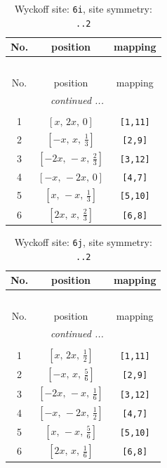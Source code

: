 \documentclass[fleqn,8pt]{jsarticle}
\begin{document}
\renewcommand{\arraystretch}{1.2}
\begin{longtable}{ccc}
\caption{Wyckoff site: {\tt 6i}, site symmetry: {\tt ..2}}
 \\
 \hline \hline
No. & position & mapping \\ \hline \endfirsthead

\multicolumn{2}{l}{\tablename\ \thetable{}} \\
 \hline \hline
No. & position & mapping \\ \hline \endhead

 \hline \hline
\multicolumn{2}{r}{\footnotesize\it continued ...} \\ \endfoot

 \hline \hline
\multicolumn{2}{r}{} \\ \endlastfoot

1 & $\left[ x,\, 2 x,\, 0 \right]$ & {\tt [1,11]} \\ \hline
2 & $\left[ - x,\, x,\, \frac{1}{3} \right]$ & {\tt [2,9]} \\ \hline
3 & $\left[ - 2 x,\, - x,\, \frac{2}{3} \right]$ & {\tt [3,12]} \\ \hline
4 & $\left[ - x,\, - 2 x,\, 0 \right]$ & {\tt [4,7]} \\ \hline
5 & $\left[ x,\, - x,\, \frac{1}{3} \right]$ & {\tt [5,10]} \\ \hline
6 & $\left[ 2 x,\, x,\, \frac{2}{3} \right]$ & {\tt [6,8]} \\
\end{longtable}
\renewcommand{\arraystretch}{1.2}
\begin{longtable}{ccc}
\caption{Wyckoff site: {\tt 6j}, site symmetry: {\tt ..2}}
 \\
 \hline \hline
No. & position & mapping \\ \hline \endfirsthead

\multicolumn{2}{l}{\tablename\ \thetable{}} \\
 \hline \hline
No. & position & mapping \\ \hline \endhead

 \hline \hline
\multicolumn{2}{r}{\footnotesize\it continued ...} \\ \endfoot

 \hline \hline
\multicolumn{2}{r}{} \\ \endlastfoot

1 & $\left[ x,\, 2 x,\, \frac{1}{2} \right]$ & {\tt [1,11]} \\ \hline
2 & $\left[ - x,\, x,\, \frac{5}{6} \right]$ & {\tt [2,9]} \\ \hline
3 & $\left[ - 2 x,\, - x,\, \frac{1}{6} \right]$ & {\tt [3,12]} \\ \hline
4 & $\left[ - x,\, - 2 x,\, \frac{1}{2} \right]$ & {\tt [4,7]} \\ \hline
5 & $\left[ x,\, - x,\, \frac{5}{6} \right]$ & {\tt [5,10]} \\ \hline
6 & $\left[ 2 x,\, x,\, \frac{1}{6} \right]$ & {\tt [6,8]} \\
\end{longtable}
\end{document}
